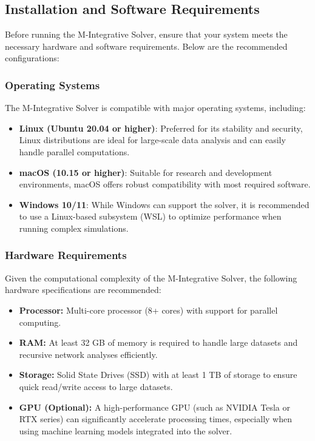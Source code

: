 \documentclass[%
 preprint, linenumbers,
 amsmath,amssymb,
 aps, physrev,
]{revtex4-2}
\begin{document}
\subsection{Installation and Software Requirements}

Before running the M-Integrative Solver, ensure that your system meets the necessary hardware and software requirements. Below are the recommended configurations:

\subsubsection{Operating Systems}
The M-Integrative Solver is compatible with major operating systems, including:
\begin{itemize}
    \item \textbf{Linux (Ubuntu 20.04 or higher)}: Preferred for its stability and security, Linux distributions are ideal for large-scale data analysis and can easily handle parallel computations.
    \item \textbf{macOS (10.15 or higher)}: Suitable for research and development environments, macOS offers robust compatibility with most required software.
    \item \textbf{Windows 10/11}: While Windows can support the solver, it is recommended to use a Linux-based subsystem (WSL) to optimize performance when running complex simulations.
\end{itemize}

\subsubsection{Hardware Requirements}
Given the computational complexity of the M-Integrative Solver, the following hardware specifications are recommended:
\begin{itemize}
    \item \textbf{Processor:} Multi-core processor (8+ cores) with support for parallel computing.
    \item \textbf{RAM:} At least 32 GB of memory is required to handle large datasets and recursive network analyses efficiently.
    \item \textbf{Storage:} Solid State Drives (SSD) with at least 1 TB of storage to ensure quick read/write access to large datasets.
    \item \textbf{GPU (Optional):} A high-performance GPU (such as NVIDIA Tesla or RTX series) can significantly accelerate processing times, especially when using machine learning models integrated into the solver.
\end{itemize}
\end{document}
